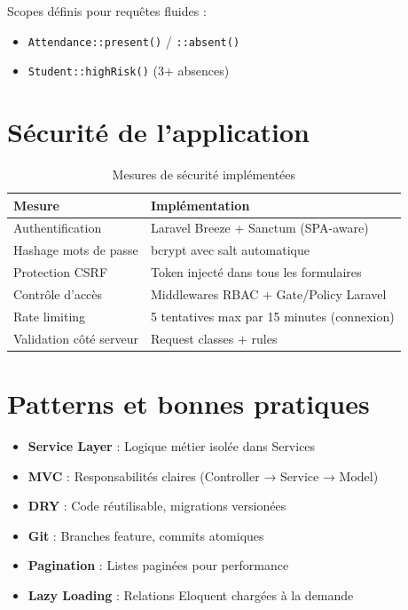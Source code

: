 \documentclass[12pt, a4paper, openright]{report}
\begin{document}
Scopes définis pour requêtes fluides :
\begin{itemize}
    \item \texttt{Attendance::present()} / \texttt{::absent()}
    \item \texttt{Student::highRisk()} (3+ absences)
\end{itemize}

\section{Sécurité de l'application}

\begin{table}[H]
    \centering
    \small
    \begin{tabular}{|l|p{7cm}|}
    \hline
    \textbf{Mesure} & \textbf{Implémentation} \\
    \hline
    Authentification & Laravel Breeze + Sanctum (SPA-aware) \\
    \hline
    Hashage mots de passe & bcrypt avec salt automatique \\
    \hline
    Protection CSRF & Token injecté dans tous les formulaires \\
    \hline
    Contrôle d'accès & Middlewares RBAC + Gate/Policy Laravel \\
    \hline
    Rate limiting & 5 tentatives max par 15 minutes (connexion) \\
    \hline
    Validation côté serveur & Request classes + rules \\
    \hline
    \end{tabular}
    \caption{Mesures de sécurité implémentées}
    \label{table:security}
\end{table}

\section{Patterns et bonnes pratiques}

\begin{itemize}
    \item \textbf{Service Layer} : Logique métier isolée dans Services
    \item \textbf{MVC} : Responsabilités claires (Controller → Service → Model)
    \item \textbf{DRY} : Code réutilisable, migrations versionées
    \item \textbf{Git} : Branches feature, commits atomiques
    \item \textbf{Pagination} : Listes paginées pour performance
    \item \textbf{Lazy Loading} : Relations Eloquent chargées à la demande
\end{itemize}
\end{document}

